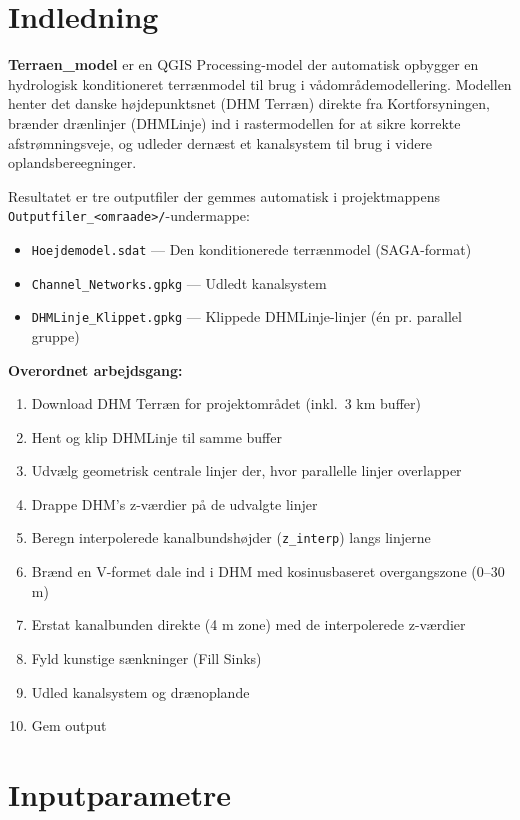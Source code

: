 \section{Indledning}

\textbf{Terraen\_model} er en QGIS Processing-model der automatisk opbygger en
hydrologisk konditioneret terrænmodel til brug i vådområdemodellering. Modellen
henter det danske højdepunktsnet (DHM Terræn) direkte fra Kortforsyningen,
brænder drænlinjer (DHMLinje) ind i rastermodellen for at sikre korrekte
afstrømningsveje, og udleder dernæst et kanalsystem til brug i videre
oplandsbereegninger.

Resultatet er tre outputfiler der gemmes automatisk i projektmappens
\texttt{Outputfiler\_<omraade>/}-undermappe:

\begin{itemize}
  \item \texttt{Hoejdemodel.sdat} — Den konditionerede terrænmodel (SAGA-format)
  \item \texttt{Channel\_Networks.gpkg} — Udledt kanalsystem
  \item \texttt{DHMLinje\_Klippet.gpkg} — Klippede DHMLinje-linjer (én pr. parallel gruppe)
\end{itemize}

\textbf{Overordnet arbejdsgang:}

\begin{enumerate}
  \item Download DHM Terræn for projektområdet (inkl.\ 3 km buffer)
  \item Hent og klip DHMLinje til samme buffer
  \item Udvælg geometrisk centrale linjer der, hvor parallelle linjer overlapper
  \item Drappe DHM's z-værdier på de udvalgte linjer
  \item Beregn interpolerede kanalbundshøjder (\texttt{z\_interp}) langs linjerne
  \item Brænd en V-formet dale ind i DHM med kosinusbaseret overgangszone (0–30 m)
  \item Erstat kanalbunden direkte (4 m zone) med de interpolerede z-værdier
  \item Fyld kunstige sænkninger (Fill Sinks)
  \item Udled kanalsystem og drænoplande
  \item Gem output
\end{enumerate}


\section{Inputparametre}

